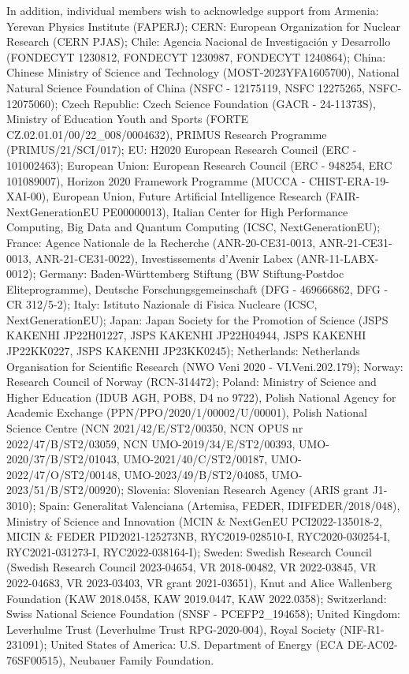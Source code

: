 In addition, individual members wish to acknowledge support from Armenia: Yerevan Physics Institute (FAPERJ); CERN: European Organization for Nuclear Research (CERN PJAS); Chile: Agencia Nacional de Investigaci\'on y Desarrollo (FONDECYT 1230812, FONDECYT 1230987, FONDECYT 1240864); China: Chinese Ministry of Science and Technology (MOST-2023YFA1605700), National Natural Science Foundation of China (NSFC - 12175119, NSFC 12275265, NSFC-12075060); Czech Republic: Czech Science Foundation (GACR - 24-11373S), Ministry of Education Youth and Sports (FORTE CZ.02.01.01/00/22\_008/0004632), PRIMUS Research Programme (PRIMUS/21/SCI/017); EU: H2020 European Research Council (ERC - 101002463); European Union: European Research Council (ERC - 948254, ERC 101089007), Horizon 2020 Framework Programme (MUCCA - CHIST-ERA-19-XAI-00), European Union, Future Artificial Intelligence Research (FAIR-NextGenerationEU PE00000013), Italian Center for High Performance Computing, Big Data and Quantum Computing (ICSC, NextGenerationEU); France: Agence Nationale de la Recherche (ANR-20-CE31-0013, ANR-21-CE31-0013, ANR-21-CE31-0022), Investissements d'Avenir Labex (ANR-11-LABX-0012); Germany: Baden-Württemberg Stiftung (BW Stiftung-Postdoc Eliteprogramme), Deutsche Forschungsgemeinschaft (DFG - 469666862, DFG - CR 312/5-2); Italy: Istituto Nazionale di Fisica Nucleare (ICSC, NextGenerationEU); Japan: Japan Society for the Promotion of Science (JSPS KAKENHI JP22H01227, JSPS KAKENHI JP22H04944, JSPS KAKENHI JP22KK0227, JSPS KAKENHI JP23KK0245); Netherlands: Netherlands Organisation for Scientific Research (NWO Veni 2020 - VI.Veni.202.179); Norway: Research Council of Norway (RCN-314472); Poland: Ministry of Science and Higher Education (IDUB AGH, POB8, D4 no 9722), Polish National Agency for Academic Exchange (PPN/PPO/2020/1/00002/U/00001), Polish National Science Centre (NCN 2021/42/E/ST2/00350, NCN OPUS nr 2022/47/B/ST2/03059, NCN UMO-2019/34/E/ST2/00393, UMO-2020/37/B/ST2/01043, UMO-2021/40/C/ST2/00187, UMO-2022/47/O/ST2/00148, UMO-2023/49/B/ST2/04085, UMO-2023/51/B/ST2/00920); Slovenia: Slovenian Research Agency (ARIS grant J1-3010); Spain: Generalitat Valenciana (Artemisa, FEDER, IDIFEDER/2018/048), Ministry of Science and Innovation (MCIN \& NextGenEU PCI2022-135018-2, MICIN \& FEDER PID2021-125273NB, RYC2019-028510-I, RYC2020-030254-I, RYC2021-031273-I, RYC2022-038164-I); Sweden: Swedish Research Council (Swedish Research Council 2023-04654, VR 2018-00482, VR 2022-03845, VR 2022-04683, VR 2023-03403, VR grant 2021-03651), Knut and Alice Wallenberg Foundation (KAW 2018.0458, KAW 2019.0447, KAW 2022.0358); Switzerland: Swiss National Science Foundation (SNSF - PCEFP2\_194658); United Kingdom: Leverhulme Trust (Leverhulme Trust RPG-2020-004), Royal Society (NIF-R1-231091); United States of America: U.S. Department of Energy (ECA DE-AC02-76SF00515), Neubauer Family Foundation.
 
